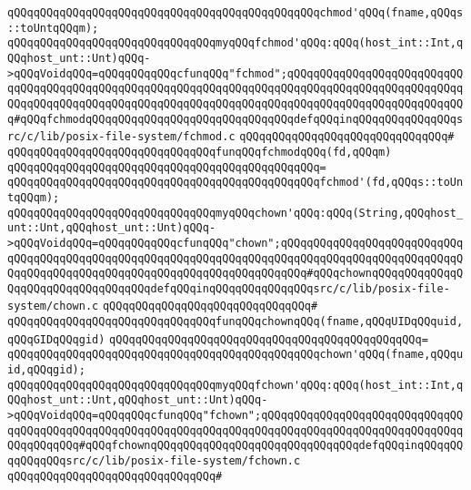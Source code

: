 \verb|qQQqqQQqqQQqqQQqqQQqqQQqqQQqqQQqqQQqqQQqqQQqqQQqchmod'qQQq(fname,qQQqs::toUntqQQqm);|\newline
\newline
\verb|qQQqqQQqqQQqqQQqqQQqqQQqqQQqqQQqmyqQQqfchmod'qQQq:qQQq(host_int::Int,qQQqhost_unt::Unt)qQQq->qQQqVoidqQQq=qQQqqQQqqQQqcfunqQQq"fchmod";qQQqqQQqqQQqqQQqqQQqqQQqqQQqqQQqqQQqqQQqqQQqqQQqqQQqqQQqqQQqqQQqqQQqqQQqqQQqqQQqqQQqqQQqqQQqqQQqqQQqqQQqqQQqqQQqqQQqqQQqqQQqqQQqqQQqqQQqqQQqqQQqqQQqqQQqqQQqqQQqqQQqqQQq#qQQqfchmodqQQqqQQqqQQqqQQqqQQqqQQqqQQqqQQqdefqQQqinqQQqqQQqqQQqqQQqsrc/c/lib/posix-file-system/fchmod.c|\newline
\verb|qQQqqQQqqQQqqQQqqQQqqQQqqQQqqQQq#|\newline
\verb|qQQqqQQqqQQqqQQqqQQqqQQqqQQqqQQqfunqQQqfchmodqQQq(fd,qQQqm)|\newline
\verb|qQQqqQQqqQQqqQQqqQQqqQQqqQQqqQQqqQQqqQQqqQQqqQQq=|\newline
\verb|qQQqqQQqqQQqqQQqqQQqqQQqqQQqqQQqqQQqqQQqqQQqqQQqfchmod'(fd,qQQqs::toUntqQQqm);|\newline
\newline
\verb|qQQqqQQqqQQqqQQqqQQqqQQqqQQqqQQqmyqQQqchown'qQQq:qQQq(String,qQQqhost_unt::Unt,qQQqhost_unt::Unt)qQQq->qQQqVoidqQQq=qQQqqQQqqQQqcfunqQQq"chown";qQQqqQQqqQQqqQQqqQQqqQQqqQQqqQQqqQQqqQQqqQQqqQQqqQQqqQQqqQQqqQQqqQQqqQQqqQQqqQQqqQQqqQQqqQQqqQQqqQQqqQQqqQQqqQQqqQQqqQQqqQQqqQQqqQQqqQQqqQQqqQQq#qQQqchownqQQqqQQqqQQqqQQqqQQqqQQqqQQqqQQqqQQqdefqQQqinqQQqqQQqqQQqqQQqsrc/c/lib/posix-file-system/chown.c|\newline
\verb|qQQqqQQqqQQqqQQqqQQqqQQqqQQqqQQq#|\newline
\verb|qQQqqQQqqQQqqQQqqQQqqQQqqQQqqQQqfunqQQqchownqQQq(fname,qQQqUIDqQQquid,qQQqGIDqQQqgid)|\newline
\verb|qQQqqQQqqQQqqQQqqQQqqQQqqQQqqQQqqQQqqQQqqQQqqQQq=|\newline
\verb|qQQqqQQqqQQqqQQqqQQqqQQqqQQqqQQqqQQqqQQqqQQqqQQqchown'qQQq(fname,qQQquid,qQQqgid);|\newline
\newline
\verb|qQQqqQQqqQQqqQQqqQQqqQQqqQQqqQQqmyqQQqfchown'qQQq:qQQq(host_int::Int,qQQqhost_unt::Unt,qQQqhost_unt::Unt)qQQq->qQQqVoidqQQq=qQQqqQQqcfunqQQq"fchown";qQQqqQQqqQQqqQQqqQQqqQQqqQQqqQQqqQQqqQQqqQQqqQQqqQQqqQQqqQQqqQQqqQQqqQQqqQQqqQQqqQQqqQQqqQQqqQQqqQQqqQQqqQQqqQQq#qQQqfchownqQQqqQQqqQQqqQQqqQQqqQQqqQQqqQQqdefqQQqinqQQqqQQqqQQqqQQqsrc/c/lib/posix-file-system/fchown.c|\newline
\verb|qQQqqQQqqQQqqQQqqQQqqQQqqQQqqQQq#|\newline
